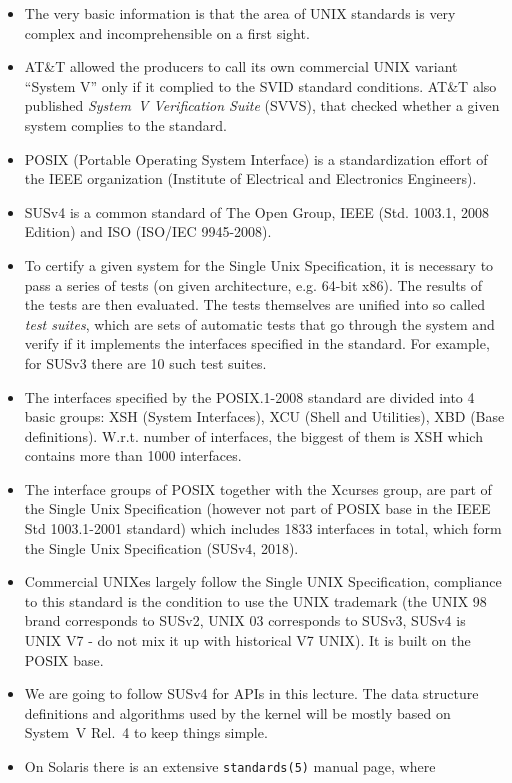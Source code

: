 \begin{itemize}
\item The very basic information is that the area of UNIX standards is very
complex and incomprehensible on a first sight.
\item AT\&T allowed the producers to call its own commercial UNIX variant
``System V'' only if it complied to the SVID standard conditions. AT\&T also
published \emph{System~V Verification Suite} (SVVS), that checked whether a given
system complies to the standard.
\item POSIX (Portable Operating System Interface) is a standardization effort
of the IEEE organization (Institute of Electrical and Electronics Engineers).
\item SUSv4 is a common standard of The Open Group, IEEE (Std. 1003.1, 2008
Edition) and ISO (ISO/IEC 9945-2008).
\item To certify a given system for the Single Unix Specification, it is necessary
to pass a series of tests (on given architecture, e.g. 64-bit x86).
The results of the tests are then evaluated. The tests themselves are unified into
so called \emph{test suites}, which are sets of automatic tests that go through
the system and verify if it implements the interfaces specified in the standard.
For example, for SUSv3 there are 10 such test suites.
\item The interfaces specified by the POSIX.1-2008 standard are divided into 4
basic groups: XSH (System Interfaces), XCU (Shell and Utilities), XBD
(Base definitions). W.r.t. number of interfaces, the biggest of them is XSH which
contains more than 1000 interfaces.
\item The interface groups of POSIX together with the Xcurses group, are part
of the Single Unix Specification (however not part of POSIX base in the IEEE Std
1003.1-2001 standard) which includes 1833 interfaces in total, which form the Single Unix
Specification (SUSv4, 2018).
\item Commercial UNIXes largely follow the Single UNIX Specification, compliance
to this standard is the condition to use the UNIX trademark
(the UNIX 98 brand corresponds to SUSv2, UNIX 03 corresponds to SUSv3, SUSv4 is
UNIX V7 - do not mix it up with historical V7 UNIX). It is built on the POSIX
base.
\item We are going to follow SUSv4 for APIs in this lecture. The data structure
definitions and algorithms used by the kernel will be mostly based on
System~V Rel.~4 to keep things simple.
\item On Solaris there is an extensive \texttt{standards(5)} manual page, where

\end{itemize}
